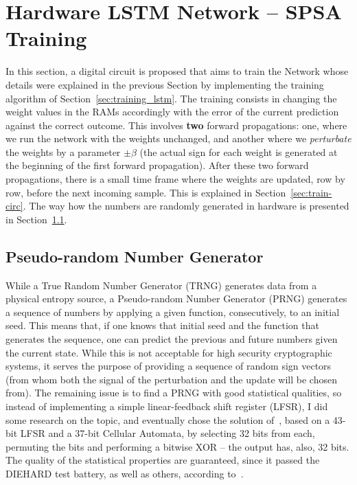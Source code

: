 \section{Hardware LSTM Network -- SPSA Training}
In this section, a digital circuit is proposed that aims to train the Network whose details were explained in the previous Section by implementing the training
algorithm of Section~\ref{sec:training_lstm}. The training consists in changing the weight values in the RAMs accordingly with the error of the current prediction
against the correct outcome. This involves \textbf{two} forward propagations: one, where we run the network with the weights unchanged, and another where we \emph{perturbate}
the weights by a parameter $\pm \beta$ (the actual sign for each weight is generated at the beginning of the first forward propagation). After these two forward propagations,
there is a small time frame where the weights are updated, row by row, before the next incoming sample. This is explained in Section~\ref{sec:train-circ}. The way how the numbers
are randomly generated in hardware is presented in Section~\ref{sec:randnum-circ}.

\subsection{Pseudo-random Number Generator}\label{sec:randnum-circ}
While a True Random Number Generator (TRNG) generates data from a physical entropy source, a Pseudo-random Number Generator (PRNG) generates a sequence of numbers by applying a given
function, consecutively, to an initial seed. This means that, if one knows that initial seed and the function that generates the sequence, one can predict the previous and
future numbers given the current state. While this is not acceptable for high security cryptographic systems, it serves the purpose of providing a sequence of random sign
vectors (from whom both the signal of the perturbation and the update will be chosen from). The remaining issue is to find a PRNG with good statistical qualities, so instead
of implementing a simple linear-feedback shift register (LFSR), I did some research on the topic, and eventually chose the solution of~\cite{Tkacik2003}, based on a 43-bit LFSR
and a 37-bit Cellular Automata, by selecting 32 bits from each, permuting the bits and performing a bitwise XOR -- the output has, also, 32 bits. The quality of the
statistical properties are guaranteed, since it passed the DIEHARD test battery, as well as others, according to~\cite{Tkacik2003}.

